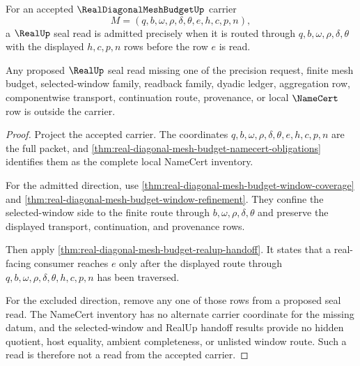 \begin{theorem}
\label{thm:real-diagonal-mesh-budget-seal-route-exactness}
For an accepted $\RealDiagonalMeshBudgetUp$ carrier
$$
M=(q,b,\omega,\rho,\delta,\theta,e,h,c,p,n),
$$
a $\RealUp$ seal read is admitted precisely when it is routed through $q,b,\omega,\rho,\delta,\theta$ with the displayed $h,c,p,n$ rows before the row $e$ is read.

Any proposed $\RealUp$ seal read missing one of the precision request, finite mesh budget, selected-window family, readback family, dyadic ledger, aggregation row, componentwise transport, continuation route, provenance, or local $\NameCert$ row is outside the carrier.
\end{theorem}
\begin{proof}
Project the accepted carrier. The coordinates $q,b,\omega,\rho,\delta,\theta,e,h,c,p,n$ are the full packet, and \autoref{thm:real-diagonal-mesh-budget-namecert-obligations} identifies them as the complete local NameCert inventory.

For the admitted direction, use \autoref{thm:real-diagonal-mesh-budget-window-coverage} and \autoref{thm:real-diagonal-mesh-budget-window-refinement}. They confine the selected-window side to the finite route through $b,\omega,\rho,\delta,\theta$ and preserve the displayed transport, continuation, and provenance rows.

Then apply \autoref{thm:real-diagonal-mesh-budget-realup-handoff}. It states that a real-facing consumer reaches $e$ only after the displayed route through $q,b,\omega,\rho,\delta,\theta,h,c,p,n$ has been traversed.

For the excluded direction, remove any one of those rows from a proposed seal read. The NameCert inventory has no alternate carrier coordinate for the missing datum, and the selected-window and RealUp handoff results provide no hidden quotient, host equality, ambient completeness, or unlisted window route. Such a read is therefore not a read from the accepted carrier.
\end{proof}

